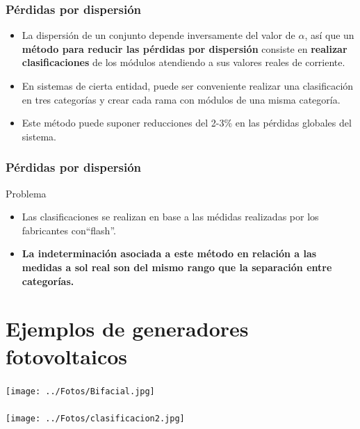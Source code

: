 \documentclass[xcolor=dvipsnames]{beamer}
\begin{document}
\begin{frame}
  \frametitle{Pérdidas por dispersión}
  \begin{itemize}
  \item La dispersión de un conjunto depende inversamente del valor de
    $\alpha$, así que un \textbf{método para reducir las pérdidas por
      dispersión} consiste en \textbf{realizar clasificaciones} de los
    módulos atendiendo a sus valores reales de corriente.
  \item En sistemas de cierta entidad, puede ser conveniente realizar
    una clasificación en tres categorías y crear cada rama con módulos
    de una misma categoría.
  \item Este método puede suponer reducciones del 2-3\% en las
    pérdidas globales del sistema.
  \end{itemize}

\end{frame}

\begin{frame}
  \frametitle{Pérdidas por dispersión}
  \begin{block}{Problema}
    \begin{itemize}
    \item Las clasificaciones se realizan en base a las médidas
      realizadas por los fabricantes con``flash''.
    \item \textbf{La indeterminación asociada a este método en
        relación a las medidas a sol real son del mismo rango que la
        separación entre categorías.}
    \end{itemize}
  \end{block}
\end{frame}

\section{Ejemplos de generadores fotovoltaicos}




\begin{frame}[plain]
  \frametitle{}

  \noindent \begin{center}
    \texttt{[image: ../Fotos/Bifacial.jpg]}
    \par\end{center}


\end{frame}

\begin{frame}[plain]
  \frametitle{}

  \noindent \begin{center}
    \texttt{[image: ../Fotos/clasificacion2.jpg]}
    \par\end{center}


\end{frame}
\end{document}
